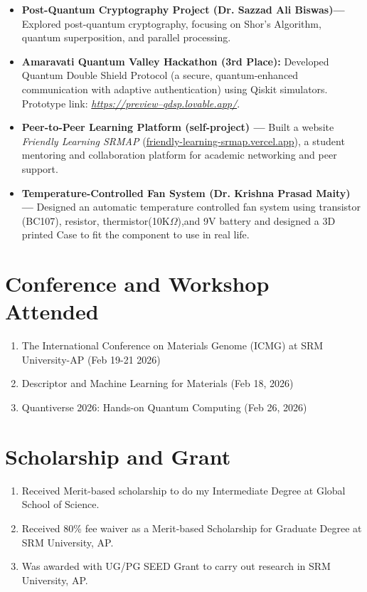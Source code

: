 \documentclass[a4paper,10pt]{article}
\begin{document}
\begin{itemize}[leftmargin=*]
    \item \textbf{Post-Quantum Cryptography Project (Dr. Sazzad Ali Biswas)—} Explored post-quantum cryptography, focusing on Shor’s Algorithm, quantum superposition, and parallel processing.
    \item \textbf{Amaravati Quantum Valley Hackathon (3rd Place):} Developed Quantum Double Shield Protocol
    (a secure, quantum-enhanced communication with adaptive authentication) using Qiskit simulators. 
    Prototype link: \textit{\href{https://preview--qdsp.lovable.app/}{https://preview--qdsp.lovable.app/}}.
    \item \textbf{Peer-to-Peer Learning Platform (self-project) —} Built a website \textit{Friendly Learning SRMAP}  (\href{https://friendly-learning-srmap.vercel.app/}{friendly-learning-srmap.vercel.app}), a student mentoring and collaboration platform for academic networking and peer support.
   \item \textbf{Temperature-Controlled Fan System (Dr. Krishna Prasad Maity) —} Designed an automatic temperature controlled fan system using transistor (BC107), resistor, thermistor(10K$\Omega$),and 9V battery and designed a 3D printed Case to fit the component to use in real life.
\end{itemize}

\section*{Conference and Workshop Attended}
\begin{enumerate}
    \item The International Conference on Materials Genome (ICMG) at SRM University-AP (Feb 19-21 2026)
    \item Descriptor and Machine Learning for Materials (Feb 18, 2026)
    \item Quantiverse 2026: Hands-on Quantum Computing (Feb 26, 2026)
\end{enumerate}

\section*{Scholarship and Grant}
\begin{enumerate}
    \item Received Merit-based scholarship to do my Intermediate Degree at Global School of Science.
    \item Received 80\% fee waiver as a Merit-based Scholarship for Graduate Degree at SRM University, AP.
    \item Was awarded with UG/PG SEED Grant to carry out research in SRM University, AP.
\end{enumerate}
\end{document}
